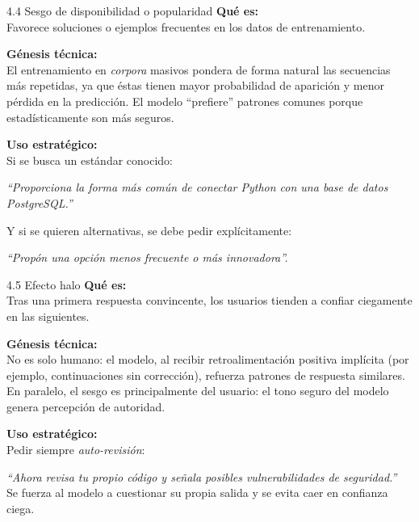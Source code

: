 \documentclass[xcolor=svgnames,t]{beamer}
\begin{document}
\begin{frame}{4.4 Sesgo de disponibilidad o popularidad}
\justifying
\textbf{Qué es:}\\
Favorece soluciones o ejemplos frecuentes en los datos de entrenamiento.

\medskip
\textbf{Génesis técnica:}\\
El entrenamiento en \textit{corpora} masivos pondera de forma natural las secuencias más repetidas, ya que éstas tienen mayor probabilidad de aparición y menor pérdida en la predicción. El modelo “prefiere” patrones comunes porque estadísticamente son más seguros.

\medskip
\textbf{Uso estratégico:}\\
Si se busca un estándar conocido:

\medskip
\textit{“Proporciona la forma más común de conectar Python con una base de datos PostgreSQL.”}

\medskip
Y si se quieren alternativas, se debe pedir explícitamente:

\medskip
\textit{“Propón una opción menos frecuente o más innovadora”.}
\end{frame}

\begin{frame}{4.5 Efecto halo}
\justifying
\textbf{Qué es:}\\
Tras una primera respuesta convincente, los usuarios tienden a confiar ciegamente en las siguientes.

\medskip
\textbf{Génesis técnica:}\\
No es solo humano: el modelo, al recibir retroalimentación positiva implícita (por ejemplo, continuaciones sin corrección), refuerza patrones de respuesta similares. En paralelo, el sesgo es principalmente del usuario: el tono seguro del modelo genera percepción de autoridad.

\medskip
\textbf{Uso estratégico:}\\
Pedir siempre \textit{auto-revisión}:

\medskip
\textit{“Ahora revisa tu propio código y señala posibles vulnerabilidades de seguridad.”}\\
Se fuerza al modelo a cuestionar su propia salida y se evita caer en confianza ciega.
\end{frame}
\end{document}
